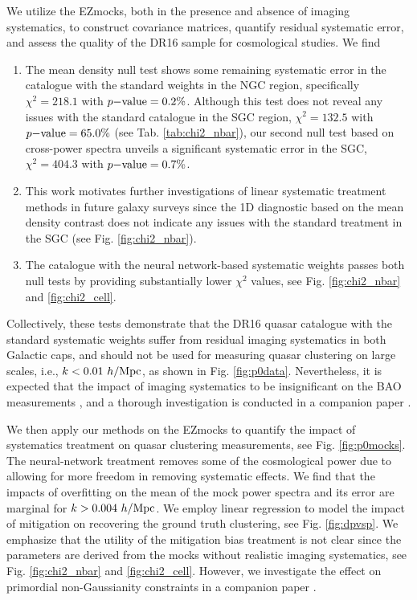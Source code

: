We utilize the EZmocks, both in the presence and absence of imaging systematics, to construct covariance matrices, quantify residual systematic error, and assess the quality of the DR16 sample for cosmological studies. We find
\begin{enumerate}[resume, leftmargin=1\parindent]

    \item The mean density null test shows some remaining systematic error in the catalogue with the standard weights in the NGC region, specifically $\chi^{2}=218.1$ with $p{\rm -value}=0.2\%$. Although this test does not reveal any issues with the standard catalogue in the SGC region, $\chi^{2}=132.5$ with $p{\rm -value}=65.0\%$ (see Tab. \ref{tab:chi2_nbar}), our second null test based on cross-power spectra unveils a significant systematic error in the SGC, $\chi^{2}=404.3$ with $p{\rm -value}=0.7\%$.
    
    \item This work motivates further investigations of linear systematic treatment methods in future galaxy surveys since the 1D diagnostic based on the mean density contrast does not indicate any issues with the standard treatment in the SGC (see Fig. \ref{fig:chi2_nbar}).
    
    \item The catalogue with the neural network-based systematic weights passes both null tests by providing substantially lower $\chi^{2}$ values, see Fig. \ref{fig:chi2_nbar} and \ref{fig:chi2_cell}.
    
\end{enumerate}

Collectively, these tests demonstrate that the DR16 quasar catalogue with the standard systematic weights suffer from residual imaging systematics in both Galactic caps, and should not be used for measuring quasar clustering on large scales, i.e., $k < 0.01~h/{\rm Mpc}$, as shown in Fig. \ref{fig:p0data}. Nevertheless, it is expected that the impact of imaging systematics to be insignificant on the BAO measurements \citep[e.g., analyses presented in ][]{hou2020qso, neveux2020qso}, and a thorough investigation is conducted in a companion paper \citep{merz2020bao}.

We then apply our methods on the EZmocks to quantify the impact of systematics treatment on quasar clustering measurements, see Fig. \ref{fig:p0mocks}. The neural-network treatment removes some of the cosmological power due to allowing for more freedom in removing systematic effects. We find that the impacts of overfitting on the mean of the mock power spectra and its error are marginal for $k > 0.004~h/{\rm Mpc}$. We employ linear regression to model the impact of mitigation on recovering the ground truth clustering, see Fig. \ref{fig:dpvsp}. We emphasize that the utility of the mitigation bias treatment is not clear since the parameters are derived from the mocks without realistic imaging systematics, see Fig. \ref{fig:chi2_nbar} and \ref{fig:chi2_cell}. However, we investigate the effect on primordial non-Gaussianity constraints in a companion paper \citep{mueller2020fnl}.


